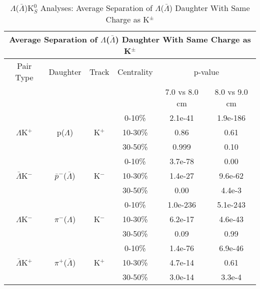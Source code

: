 \documentclass[../AnalysisNoteJBuxton.tex]{subfiles}
\begin{document}
\begin{table}
 \centering
 \begin{tabular}{|c|c|c|c|c|c|}
 \multicolumn{6}{c}{Average Separation of $\Lambda$($\bar{\Lambda}$) Daughter With Same Charge as K$^{\pm}$} \\
  \hline
  Pair Type & Daughter & Track & Centrality & \multicolumn{2}{c|}{p-value} \\
  \cline{5-6}
   & & & & 7.0 vs 8.0 cm & 8.0 vs 9.0 cm \\
  \hline
   & & & 0-10\% & 2.1e-41 & 1.9e-186 \\
  $\Lambda$K$^{+}$ & p($\Lambda$) & K$^{+}$ 
     & 10-30\% & 0.86 & 0.61 \\
   & & & 30-50\% & 0.999 & 0.10 \\
  \hline
   & & & 0-10\% & 3.7e-78 & 0.00 \\
   $\bar{\Lambda}$K$^{-}$ & $\bar{p}^{-}$($\bar{\Lambda}$) & K$^{-}$
     & 10-30\% & 1.4e-27 & 9.6e-62 \\
   & & & 30-50\% & 0.00 & 4.4e-3 \\
  \hline \hline
   & & & 0-10\% & 1.0e-236 & 5.1e-243 \\
   $\Lambda$K$^{-}$ & $\pi^{-}$($\Lambda$) & K$^{-}$ 
     & 10-30\% & 6.2e-17 & 4.6e-43 \\
   & & & 30-50\% & 0.09 & 0.99 \\
  \hline
   & & & 0-10\% & 1.4e-76 & 6.9e-46 \\
   $\bar{\Lambda}$K$^{+}$ & $\pi^{+}$($\bar{\Lambda}$) & K$^{+}$
     & 10-30\% & 4.7e-14 & 0.61 \\
   & & & 30-50\% & 3.0e-14 & 3.3e-4 \\
  \hline
 \end{tabular}
 \caption{$\Lambda$($\bar{\Lambda}$)K$^{0}_{S}$ Analyses: Average Separation of $\Lambda$($\bar{\Lambda}$) Daughter With Same Charge as K$^{\pm}$}
 \label{tab:AvgSepLamKch}
\end{table}
\end{document}

